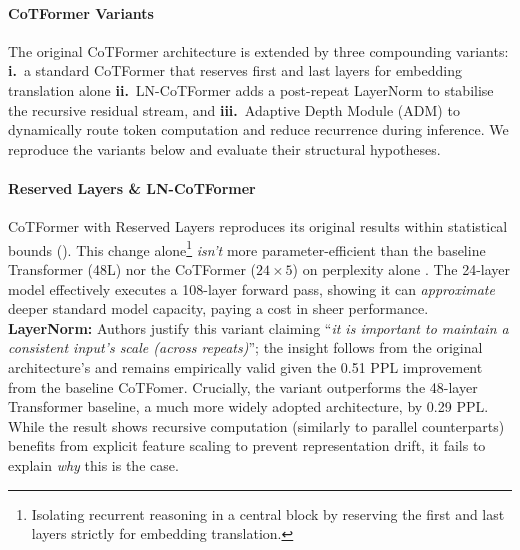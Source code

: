 \documentclass[10pt, letterpaper]{article} %
\begin{document}
\paragraph{CoTFormer Variants} The original CoTFormer architecture is extended by three compounding variants: \textbf{i.}~a standard CoTFormer that reserves first and last layers for embedding translation alone \textbf{ii.}~LN-CoTFormer adds a post-repeat LayerNorm to stabilise the recursive residual stream, and \textbf{iii.}~Adaptive Depth Module (ADM) to dynamically route token computation and reduce recurrence during inference. We reproduce the variants below and evaluate their structural hypotheses.
\begin{table}[H]
\centering
{}
\caption{Reproduction of the CoTFormer's Table 2 results at \texttt{40k} training steps.}
\label{tab:table2-repro}
\end{table}
\paragraph{Reserved Layers \& LN-CoTFormer}\label{sec:RLLN}
CoTFormer with Reserved Layers reproduces its original results within statistical bounds (). This change alone\footnote{Isolating recurrent reasoning in a central block by reserving the first and last layers strictly for embedding translation.} \emph{isn't} more parameter-efficient than the baseline Transformer (48L) nor the CoTFormer ($24\times5$) on perplexity alone . The 24-layer model effectively executes a 108-layer forward pass, showing it can \emph{approximate} deeper standard model capacity, paying a cost in sheer performance. \textbf{LayerNorm:} Authors justify this variant claiming ``\emph{it is important to maintain a consistent input’s scale (across repeats)}''; the insight follows from the original architecture's \cite{vaswani2017attention} and remains empirically valid given the 0.51 PPL improvement from the baseline CoTFomer. Crucially, the variant outperforms the 48-layer Transformer baseline, a much more widely adopted architecture, by 0.29 PPL. While the result shows recursive computation (similarly to parallel counterparts) benefits from explicit feature scaling to prevent representation drift, it fails to explain \emph{why} this is the case.
\end{document}
